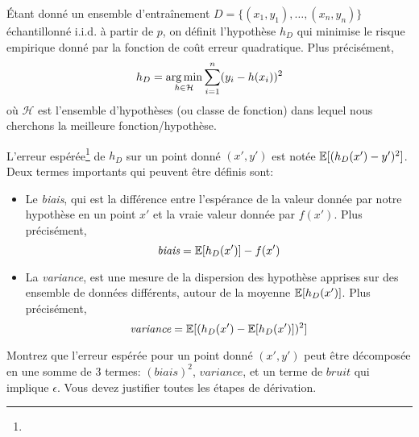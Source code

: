 {{Étant donné un ensemble d'entraînement $D=\{({x}_1, y_1),\dots,({x}_n, y_n)\}$ échantillonné i.i.d. à partir de $p$, on définit l'hypothèse $h_D$ qui minimise le risque empirique donné par la fonction de coût erreur quadratique. Plus précisément,
$$
h_D= \operatorname*{arg\,min}_{h\in \mathcal H}  \sum_{i=1}^n (y_i - h({x}_i))^2
$$
où $\mathcal H$ est l'ensemble d'hypothèses (ou classe de fonction) dans lequel nous cherchons la meilleure fonction/hypothèse.

L'erreur espérée\footnote{  } de $h_D$ sur un point donné $(x',y')$ est notée $\operatorname*{\mathbb{E}}[(h_D({x'}) - y')^2]$. Deux termes importants qui peuvent être définis sont:
\begin{itemize}
    \item Le \emph{biais}, qui est la différence entre l'espérance de la valeur donnée par notre hypothèse en un point ${ x}'$ et la vraie valeur donnée par  $f({x'})$. Plus précisément,
$$
\textit{biais}= \operatorname*{\mathbb{E}}[h_D({x'})]-f({x'})
$$
\item La \emph{variance}, est une mesure de la dispersion des hypothèse apprises sur des ensemble de données différents, autour de la moyenne $\operatorname*{\mathbb{E}}[h_D({x'})]$. Plus précisément,
$$
\textit{variance}= \operatorname*{\mathbb{E}}[(h_D({x'}) - \operatorname*{\mathbb{E}}[h_D({x'})])^2]
$$
\end{itemize}

Montrez que l'erreur espérée pour un point donné $({x'},y')$ peut être décomposée en une somme de 3 termes: $(\textit{biais})^2$, $\textit{variance}$, et un terme de $\textit{bruit}$ qui implique $\epsilon$. Vous devez justifier toutes les étapes de dérivation.
}
}
